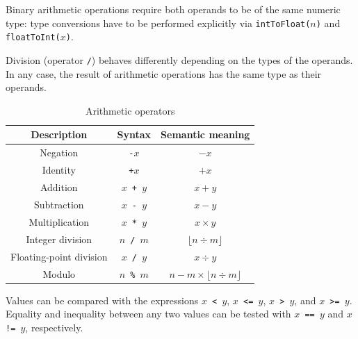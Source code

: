 \documentclass[UdineBachThesis,american,11pt]{PhdThesis}
\begin{document}
  Binary arithmetic operations require both operands to be of the same numeric
  type: type conversions have to be performed explicitly via
  \mbox{\texttt{intToFloat($n$)}} and \mbox{\texttt{floatToInt($x$)}}.

  Division (operator \texttt{/}) behaves differently depending on the types of
  the operands. In any case, the result of arithmetic operations has the same
  type as their operands.

  \begin{table}[H]
    \centering

    \begin{tabular}{|c|c|c|}
      \hline

      Description &
      Syntax &
      Semantic meaning \\
      \hline

      Negation &
      \texttt{-$x$} &
      $-x$ \\

      Identity &
      \texttt{+$x$} &
      $+x$ \\

      Addition &
      \texttt{$x$ + $y$} &
      $x + y$ \\

      Subtraction &
      \texttt{$x$ - $y$} &
      $x - y$ \\

      Multiplication &
      \texttt{$x$ * $y$} &
      $x \times y$ \\

      Integer division &
      \texttt{$n$ / $m$} &
      $\lfloor n \div m \rfloor$ \\

      Floating-point division &
      \texttt{$x$ / $y$} &
      $x \div y$ \\

      Modulo &
      \texttt{$n$ \% $m$} &
      $n - m \times \lfloor n \div m \rfloor$ \\
      \hline
    \end{tabular}

    \caption{Arithmetic operators}
  \end{table}

  Values can be compared with the expressions \mbox{\texttt{$x$ < $y$}},
  \mbox{\texttt{$x$ <= $y$}}, \mbox{\texttt{$x$ > $y$}}, and
  \mbox{\texttt{$x$ >= $y$}}. Equality and inequality between any two values can
  be tested with \mbox{\texttt{$x$ == $y$}} and \mbox{\texttt{$x$ != $y$}},
  respectively.
\end{document}
